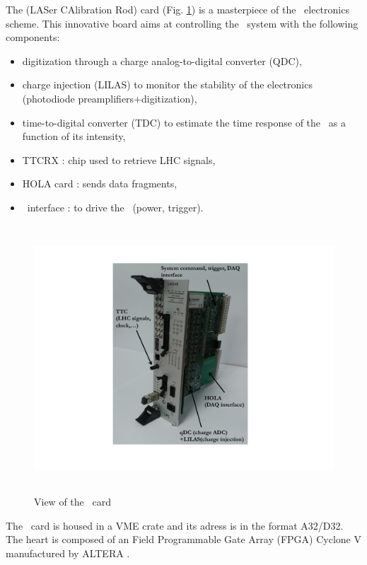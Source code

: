 The \lascar (LASer CAlibration Rod) card (Fig. \ref{fig:laslascar}) is a masterpiece of the \lasii~electronics scheme. This innovative board aims at controlling the \las~system with the following components:
\begin{itemize}

\item digitization through a charge analog-to-digital converter (QDC),

\item charge injection (LILAS) to monitor the stability of the electronics (photodiode preamplifiers+digitization),

\item time-to-digital converter (TDC) to estimate the time response of the \las~as a function of its intensity,

\item TTCRX : chip used to retrieve LHC signals,

\item HOLA card : sends data fragments,

\item \laser~interface : to drive the \las~(power, trigger).

\end{itemize}

\begin{figure}[htbp]

\centering
\includegraphics[height=10cm]{figures/Lascar_photo_black.pdf}
\caption{View of the \lascar~card}\label{fig:laslascar}
\end{figure}

The \lascar~card is housed in a VME crate and its adress is in the format A32/D32. The heart is composed of an Field Programmable Gate Array (FPGA) Cyclone V manufactured by ALTERA \cite{ref:altera-cyclone}.

